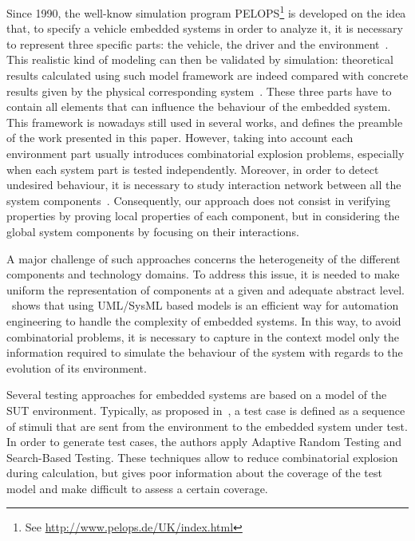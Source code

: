 \documentclass{llncs}
\begin{document}
Since 1990, the well-know simulation program PELOPS\footnote{See
  \url{http://www.pelops.de/UK/index.html}} is developed on the idea
that, to specify a vehicle embedded systems in order to analyze it, it
is necessary to represent three specific parts: the vehicle, the
driver and the environment~\cite{EHMANNS2000}.
This realistic kind of modeling can then be validated by simulation:
theoretical results calculated using such model framework are indeed
compared with concrete results given by the physical corresponding
system~\cite{GLASER2002}. These three parts have to contain all
elements that can influence the behaviour of the embedded system. This 
framework is nowadays still used in several works, and defines the
preamble of the work presented in this paper. However, taking into
account each environment part usually introduces combinatorial
explosion problems, especially when each system part is tested
independently. Moreover, in order to detect undesired
behaviour, it is necessary to study interaction network between all
the system components~\cite{Petin}. Consequently, our approach does
not consist in verifying properties by proving local properties of
each component, but in considering the global system components by
focusing on their interactions. 

A major challenge of such approaches concerns the heterogeneity of
the different components and technology domains. To address this issue,
it is needed to make uniform the representation of components at a
given and adequate abstract level. \cite{Bonfe}~shows that using UML/SysML based
models is an efficient way for automation engineering to handle the complexity
of embedded systems. In this way, to avoid combinatorial problems, it
is necessary to capture in the context model only the information
required to simulate the behaviour of the system with regards to the
evolution of its environment. 

Several testing approaches for embedded systems are based on a model
of the SUT environment. Typically, as
proposed in~\cite{Simula}, a test case is defined as a sequence of
stimuli that are sent from the environment to the embedded system
under test. In order to
generate test cases, the authors apply Adaptive Random Testing
and Search-Based Testing. These techniques allow to reduce
combinatorial explosion during calculation, but gives poor information
about the coverage of the test model and make difficult to assess a
certain coverage.
\end{document}
